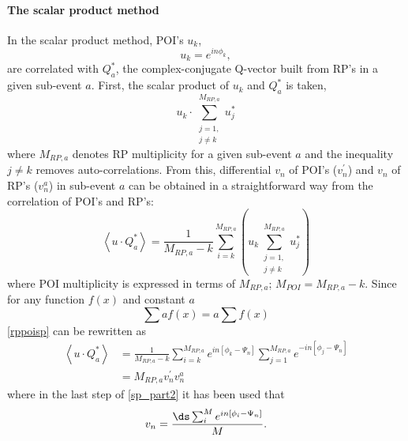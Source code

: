 \documentclass[a4paper]{book}
\numberwithin{equation}{subsection}
\begin{document}
\paragraph{The scalar product method}
In the scalar product method, POI's $u_k$,
\begin{equation}\label{spderiv}
	u_k = e^{i n \phi_k},
\end{equation}
are correlated with $Q^*_a$, the complex-conjugate Q-vector built from RP's in a given sub-event $a$. First, the scalar product of $u_k$ and $Q^*_a$ is taken,
\begin{equation}
	u_k \cdotp \sum_{\substack{ j=1,\\j \neq k}}^{M_{RP, a}} u^*_j
\end{equation}
where $M_{RP, a}$ denotes RP multiplicity for a given sub-event $a$ and the inequality $j \neq k$ removes auto-correlations. From this, differential $v_n$ of POI's ($v_n^{\prime}$) and $v_n$ of RP's ($v_n^a$) in sub-event $a$ can be obtained in a straightforward way from the correlation of POI's and RP's:
\begin{equation}\label{rppoisp}
	\left< u \cdotp Q^*_a \right> = \frac{1}{M_{RP, a}-k}\sum_{i=k}^{M_{RP, a}} \left( u_k \sum_{\substack{ j=1,\\j \neq k}}^{M_{RP, a}} u^*_j \right)
\end{equation}
where POI multiplicity is expressed in terms of $M_{RP, a}$; $M_{POI} = M_{RP, a} - k$. Since for any function $f(x)$ and constant $a$
\begin{equation}
	\sum a f(x) = a \sum f(x) 
\end{equation}
\ref{rppoisp} can be rewritten as
\begin{align}\label{sp_part2}
	\left< u \cdotp Q^*_a \right> & = \frac{1}{M_{RP, a}-k}\sum_{i=k}^{M_{RP, a}} e^{i n [\phi_k - \Psi_n]} \sum_{j=1}^{M_{RP, a}} e^{- i n [\phi_j - \Psi_n]} \\
	                              & = M_{RP, a} v^{\prime}_n v_n^a \nonumber                                                                                   
\end{align}
where in the last step of \ref{sp_part2} it has been used that
\begin{equation}
	v_n = \frac{\ds \sum_i^M e^{in[\phi_i - \Psi_n]} }{M}.
\end{equation}
\end{document}
